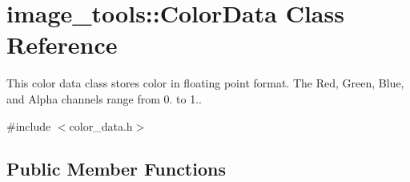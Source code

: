 \hypertarget{classimage__tools_1_1ColorData}{}\section{image\+\_\+tools\+:\+:Color\+Data Class Reference}
\label{classimage__tools_1_1ColorData}


This color data class stores color in floating point format. The Red, Green, Blue, and Alpha channels range from 0. to 1..  




{\ttfamily \#include $<$color\+\_\+data.\+h$>$}

\subsection*{Public Member Functions}
